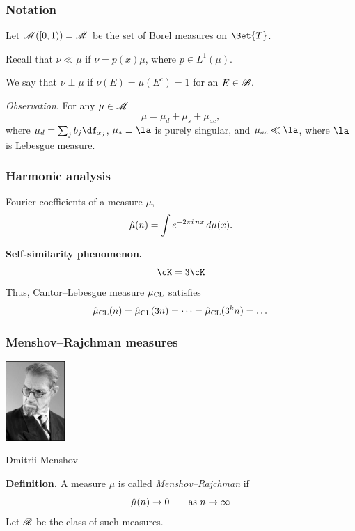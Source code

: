 \begin{frame}
  \frametitle{Notation}

  Let $\mathscr{M}([0,1)) = \mathscr{M}$ be the set of Borel measures on $\Set{T}$.

  \bigskip
  Recall that $\nu \ll \mu$ if $\nu = p(x)\mu$, where $p \in L^1(\mu)$.

  \bigskip
  We say that $\nu \perp \mu$ if $\nu(E) = \mu(E^c) = 1$ for an $E \in \mathscr{B}$.

  \bigskip
  {\it Observation}. For any $\mu \in \mathscr{M}$
  $$
    \mu = \mu_d + \mu_s + \mu_{ac}, 
  $$
  where $\mu_d = \sum_j b_j \df_{x_j}$, $\mu_s \perp \la$ is purely singular, 
  and $\mu_{ac} \ll \la$, where $\la$ is Lebesgue measure. 

\end{frame}


\begin{frame}
  \frametitle{Harmonic analysis}

  Fourier coefficients of a measure $\mu$, 
  $$
    \Hat\mu(n) = \int e^{-2\pi i\, nx} \,d\mu(x).  
  $$
  
  \pause
  \bigskip
  {\bf Self-similarity phenomenon.} %
  $$\cK = 3\cK$$ %
  Thus, Cantor--Lebesgue measure $\mu_{{\mathrm{CL}}}$ satisfies 
  $$
    \Hat\mu_{{\mathrm{CL}}}(n) = \Hat\mu_{{\mathrm{CL}}}(3n) = \dots = \Hat\mu_{{\mathrm{CL}}}(3^k n) = \dots
  $$
  
\end{frame}


\begin{frame}
  \frametitle{Menshov--Rajchman measures}

  \begin{center}
  \includegraphics[height=30mm]{Menshov_DE}
  
  Dmitrii Menshov
  \end{center}

  {\bf Definition.} A measure $\mu$ is called {\it Menshov--Rajchman\/} if
  $$
    \Hat\mu(n) \to 0 \qquad \text{as $n \to \infty$}
  $$
  Let $\mathscr{R}$ be the class of such measures.
  
\end{frame}


